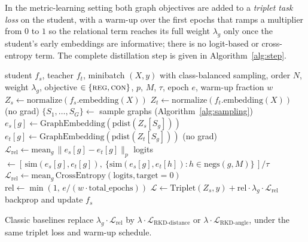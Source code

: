 \documentclass[11pt,letterpaper]{article}
\begin{document}
In the metric-learning setting both graph objectives are added to a \emph{triplet task
loss} on the student, with a warm-up over the first epochs that ramps a multiplier from
$0$ to $1$ so the relational term reaches its full weight $\lambda_g$ only once the
student's early embeddings are informative; there is no logit-based or cross-entropy
term. The complete distillation step is given in Algorithm~\ref{alg:step}.

\begin{algorithm}[htbp]
\caption{Graph-RKD distillation step (metric learning)}
\label{alg:step}
\begin{algorithmic}[1]
\Require student $f_s$, teacher $f_t$, minibatch $(X, y)$ with class-balanced sampling, order $N$, weight $\lambda_g$, objective $\in \{\textsc{reg}, \textsc{con}\}$, $p$, $M$, $\tau$, epoch $e$, warm-up fraction $w$
\State $Z_s \gets \mathrm{normalize}(f_s.\mathrm{embedding}(X))$ 
\State $Z_t \gets \mathrm{normalize}(f_t.\mathrm{embedding}(X))$ (no grad) 
\State $\{ S_1, \ldots, S_G \} \gets$ sample graphs (Algorithm~\ref{alg:sampling})
 
    \State $e_s[g] \gets \mathrm{GraphEmbedding}(\mathrm{pdist}(Z_s[S_g]))$ 
    \State $e_t[g] \gets \mathrm{GraphEmbedding}(\mathrm{pdist}(Z_t[S_g]))$ (no grad)
\EndFor
{}
    \State $\mathcal{L}_{\mathrm{rel}} \gets \mathrm{mean}_g \, \lVert e_s[g] - e_t[g] \rVert_p$
\Else {}
        \State logits $\gets [\, \mathrm{sim}(e_s[g], e_t[g]),\ \{ \mathrm{sim}(e_s[g], e_t[h]) : h \in \mathrm{negs}(g, M) \} \,] / \tau$
    \EndFor
    \State $\mathcal{L}_{\mathrm{rel}} \gets \mathrm{mean}_g \, \mathrm{CrossEntropy}(\text{logits}, \text{target} = 0)$ 
\EndIf
\State $\mathrm{rel} \gets \min(1,\, e / (w \cdot \text{total\_epochs}))$ 
\State $\mathcal{L} \gets \mathrm{Triplet}(Z_s, y) + \mathrm{rel} \cdot \lambda_g \cdot \mathcal{L}_{\mathrm{rel}}$
\State backprop and update $f_s$
\end{algorithmic}
\end{algorithm}

\noindent
Classic baselines replace $\lambda_g \cdot \mathcal{L}_{\mathrm{rel}}$ by
$\lambda \cdot \mathcal{L}_{\text{RKD-distance}}$ or
$\lambda \cdot \mathcal{L}_{\text{RKD-angle}}$, under the same triplet loss and
warm-up schedule.
\end{document}
